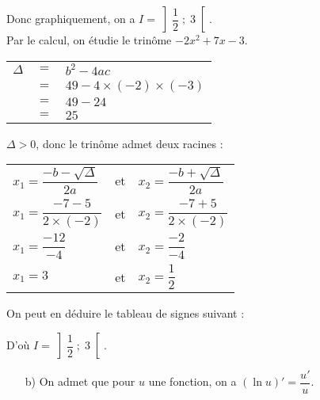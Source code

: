 Donc graphiquement, on a $I = \left]\dfrac{1}{2} \; ; \; 3\right[$. \\

Par le calcul, on étudie le trinôme $-2x^2 + 7x - 3$. \\

\begin{tabular}{lll}
$\Delta$ & $=$ & $b^2 - 4ac$ \\
& $=$ & $49 - 4 \times \left(-2\right) \times \left(-3\right)$ \\
& $=$ & $49 - 24$ \\
& $=$ & $25$ \\
\end{tabular}

\newpage

\vspace*{-1.5cm}

$\Delta > 0$, donc le trinôme admet deux racines : \\

\begin{tabular}{lll}
$x_1 = \dfrac{-b - \sqrt{\Delta}}{2a}$ & et & $x_2 = \dfrac{-b + \sqrt{\Delta}}{2a}$ \vspace*{.3cm} \\
$x_1 = \dfrac{-7 - 5}{2\times \left(-2\right)}$ & et & $x_2 = \dfrac{-7 + 5}{2\times \left(-2\right)}$ \vspace*{.3cm} \\
$x_1 = \dfrac{-12}{-4}$ & et & $x_2 = \dfrac{-2}{-4}$ \vspace*{.3cm} \\
$x_1 = 3$ & et & $x_2 = \dfrac{1}{2}$ \\
\end{tabular}

\vspace*{.5cm}

On peut en déduire le tableau de signes suivant : \\


\vspace*{.3cm}

D'où $I = \left]\dfrac{1}{2} \; ; \; 3\right[$. \\

\begin{itemize}
\item[b)] On admet que pour $u$ une fonction, on a $\left(\ln u\right)' = \dfrac{u'}{u}$. \vspace*{.3cm} \\
\end{itemize}

